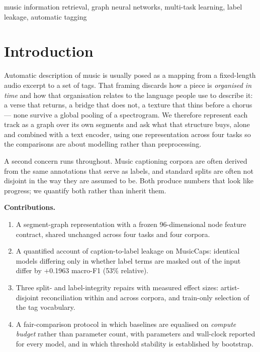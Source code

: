 \documentclass[conference]{IEEEtran}
\newcommand{\LeakGap}{$+$0.1963}
\newcommand{\LeakPct}{53}
\begin{document}
\begin{IEEEkeywords}
music information retrieval, graph neural networks, multi-task learning,
label leakage, automatic tagging
\end{IEEEkeywords}

\section{Introduction}
Automatic description of music is usually posed as a mapping from a
fixed-length audio excerpt to a set of tags. That framing discards how a piece
is \emph{organised in time} and how that organisation relates to the language
people use to describe it: a verse that returns, a bridge that does not, a
texture that thins before a chorus --- none survive a global pooling of a
spectrogram. We therefore represent each track as a graph over its own segments
and ask what that structure buys, alone and combined with a text encoder, using
one representation across four tasks so the comparisons are about modelling
rather than preprocessing.

A second concern runs throughout. Music captioning corpora are often derived
from the same annotations that serve as labels, and standard splits are often
not disjoint in the way they are assumed to be. Both produce numbers that look
like progress; we quantify both rather than inherit them.

\textbf{Contributions.}
\begin{enumerate}
\item A segment-graph representation with a frozen 96-dimensional node feature
      contract, shared unchanged across four tasks and four corpora.
\item A quantified account of caption-to-label leakage on MusicCaps: identical
      models differing only in whether label terms are masked out of the input
      differ by \LeakGap{} macro-F1 (\LeakPct{}\% relative).
\item Three split- and label-integrity repairs with measured effect sizes:
      artist-disjoint reconciliation within and across corpora, and train-only
      selection of the tag vocabulary.
\item A fair-comparison protocol in which baselines are equalised on
      \emph{compute budget} rather than parameter count, with parameters and
      wall-clock reported for every model, and in which threshold stability is
      established by bootstrap.
\end{enumerate}
\end{document}
